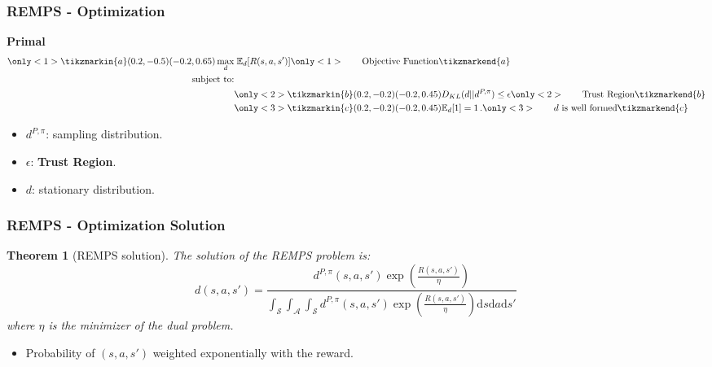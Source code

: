 \documentclass[english,aspectratio=1610]{beamer}
\newcommand{\sas}{\int_\mathcal{S} \int_\mathcal{A} \int_\mathcal{S}}
\theoremstyle{mystyle}
\theoremstyle{mystyle}
\newtheorem{thr}{Theorem}
\theoremstyle{mystyle}
\newtheorem{cor}{Corollary}
\begin{document}
\begin{frame}
\frametitle{REMPS - Optimization}
\hspace{0.45\textwidth} \textbf{Primal}
\begin{align*}
\only<1>{\tikzmarkin{a}(0.2,-0.5)(-0.2,0.65)}
	\max_{d} & \; \mathbb{E}_{d} [R(s,a,s')] \only<1>{\qquad \text{Objective Function} \tikzmarkend{a}}\\
	\text{subject to:} & \notag\\
	& \only<2>{\tikzmarkin{b}(0.2,-0.2)(-0.2,0.45)} D_{KL}(d || d^{P,\pi})
	\leq \epsilon \only<2>{\qquad \text{Trust Region}\tikzmarkend{b}} \\
	& \only<3>{\tikzmarkin{c}(0.2,-0.2)(-0.2,0.45)} \mathbb{E}_{d} [1] = 1 \, . \only<3>{\qquad \text{$d$ is well formed}  \tikzmarkend{c}}
\end{align*}
\begin{itemize}
\item $d^{P,\pi}$: sampling distribution.
\item $\epsilon$: \textbf{Trust Region}.
\item $d$: stationary distribution.
\end{itemize}
\end{frame}

\begin{frame}
\frametitle{REMPS - Optimization Solution}
\begin{thr}[REMPS solution]
The solution of the REMPS problem is:
\begin{equation}
	d(s,a,s') = \frac{d^{P,\pi}(s,a,s') \exp \left(\frac{R(s,a,s')}{\eta} \right)}{\sas d^{P,\pi}(s,a,s') \exp \left( \frac{R(s,a,s')}{\eta} \right) \mathrm{d}s \mathrm{d}a \mathrm{d}s' } \,
\end{equation}
where $\eta$ is the minimizer of the dual problem.
\end{thr}
\begin{itemize}
	\item Probability of $(s,a,s')$ weighted exponentially with the reward.
\end{itemize}
\end{frame}

\end{document}
